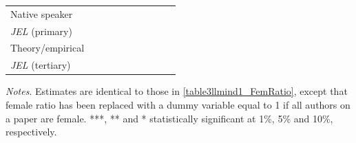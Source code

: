 \begin{table}
\begin{threeparttable}
\begin{tabular}{p{4.5cm}S@{}S@{}S@{}S@{}S@{}S@{}S@{}S@{}S@{}}
            Native speaker                &               &               &               &               &           {}   &           {}   &           {}   &           {}   &           {}   \\
            \textit{JEL} (primary)        &               &               &               &               &               &               &           {}   &               &               \\
            Theory/empirical              &               &               &               &               &               &               &               &           {}   &               \\
            \textit{JEL} (tertiary)       &               &               &               &               &               &               &               &               &           {}   \\
            \bottomrule
        \end{tabular}
        \begin{tablenotes}
            \tiny
            \item \textit{Notes}. Estimates are identical to those in \autoref{table3llmind1_FemRatio}, except that female ratio has been replaced with a dummy variable equal to 1 if all authors on a paper are female. ***, ** and * statistically significant at 1\%, 5\% and 10\%, respectively.
        \end{tablenotes}
    \end{threeparttable}

\end{table}
